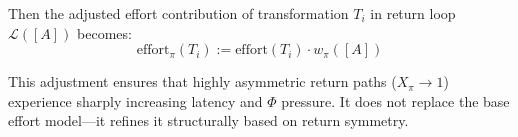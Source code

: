 Then the adjusted effort contribution of transformation $T_i$ in return loop $\mathcal{L}([A])$ becomes:
\begin{equation} \label{eq:asymmetry-effort}
\text{effort}_\pi(T_i) := \text{effort}(T_i) \cdot w_\pi([A])
\end{equation}

This adjustment ensures that highly asymmetric return paths ($X_\pi \to 1$) experience sharply increasing latency and $\Phi$ pressure. It does not replace the base effort model—it refines it structurally based on return symmetry.
